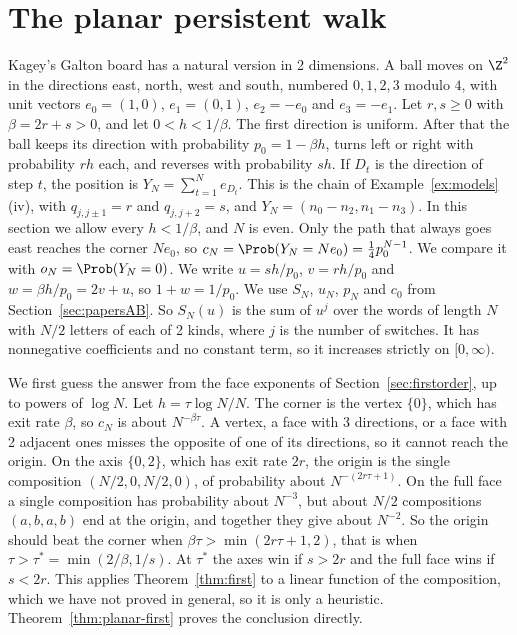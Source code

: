 \section{The planar persistent walk}\label{sec:planar}

Kagey's Galton board has a natural version in 2 dimensions. A ball moves on $\Z^2$ in the
directions east, north, west and south, numbered $0,1,2,3$ modulo $4$, with unit vectors
$e_0=(1,0)$, $e_1=(0,1)$, $e_2=-e_0$ and $e_3=-e_1$. Let $r,s\ge0$ with $\beta=2r+s>0$, and let
$0<h<1/\beta$. The first direction is uniform. After that the ball keeps its direction with
probability $p_0=1-\beta h$, turns left or right with probability $rh$ each, and reverses with
probability $sh$. If $D_t$ is the direction of step $t$, the position is
$Y_N=\sum_{t=1}^Ne_{D_t}$. This is the chain of Example~\ref{ex:models}(iv), with $q_{j,j\pm1}=r$
and $q_{j,j+2}=s$, and $Y_N=(n_0-n_2,n_1-n_3)$. In this section we allow every $h<1/\beta$, and $N$
is even. Only the path that always goes east reaches the corner $Ne_0$, so
$c_N=\Prob(Y_N=Ne_0)=\frac14p_0^{N-1}$. We compare it with $o_N=\Prob(Y_N=0)$. We write
$u=sh/p_0$, $v=rh/p_0$ and $w=\beta h/p_0=2v+u$, so $1+w=1/p_0$. We use $S_N$, $u_N$, $p_N$
and $c_0$ from Section~\ref{sec:papersAB}. So $S_N(u)$ is the sum of $u^j$ over the words of
length $N$ with $N/2$ letters of each of 2 kinds, where $j$ is the number of switches. It has
nonnegative coefficients and no constant term, so it increases strictly on $[0,\infty)$.

We first guess the answer from the face exponents of Section~\ref{sec:firstorder}, up to powers of
$\log N$. Let $h=\tau\log N/N$. The corner is the vertex $\{0\}$, which has exit rate $\beta$, so
$c_N$ is about $N^{-\beta\tau}$. A vertex, a face with 3 directions, or a face with 2 adjacent ones
misses the opposite of one of its directions, so it cannot reach the origin. On the axis $\{0,2\}$, which has exit rate
$2r$, the origin is the single composition $(N/2,0,N/2,0)$, of probability about $N^{-(2r\tau+1)}$.
On the full face a single composition has probability about $N^{-3}$, but about $N/2$ compositions
$(a,b,a,b)$ end at the origin, and together they give about $N^{-2}$. So the origin should beat the
corner when $\beta\tau>\min(2r\tau+1,2)$, that is when $\tau>\tau^*=\min(2/\beta,1/s)$. At $\tau^*$
the axes win if $s>2r$ and the full face wins if $s<2r$. This applies Theorem~\ref{thm:first} to a
linear function of the composition, which we have not proved in general, so it is only a heuristic.
Theorem~\ref{thm:planar-first} proves the conclusion directly.

